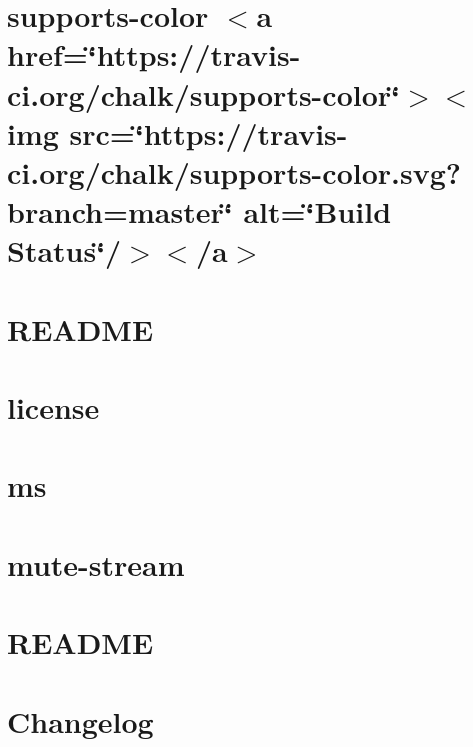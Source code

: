 \let\mypdfximage\pdfximage\def\pdfximage{\immediate\mypdfximage}\documentclass[twoside]{book}
\newcommand{\+}{\discretionary{\mbox{\scriptsize$\hookleftarrow$}}{}{}}
\begin{document}
\chapter{supports-\/color $<$a href=\char`\"{}https\+://travis-\/ci.\+org/chalk/supports-\/color\char`\"{}$>$$<$img src=\char`\"{}https\+://travis-\/ci.\+org/chalk/supports-\/color.\+svg?branch=master\char`\"{} alt=\char`\"{}\+Build Status\char`\"{}/$>$$<$/a$>$}
\label{md_heap-visualizer_node_modules_mocha_node_modules_supports-color_readme}

\chapter{R\+E\+A\+D\+ME}
\label{md_heap-visualizer_node_modules_mocha__r_e_a_d_m_e}

\chapter{license}
\label{md_heap-visualizer_node_modules_ms_license}

\chapter{ms}
\label{md_heap-visualizer_node_modules_ms_readme}

\chapter{mute-\/stream}
\label{md_heap-visualizer_node_modules_mute-stream__r_e_a_d_m_e}

\chapter{R\+E\+A\+D\+ME}
\label{md_heap-visualizer_node_modules_natural-compare__r_e_a_d_m_e}

\chapter{Changelog}
\label{md_heap-visualizer_node_modules_nice-try__c_h_a_n_g_e_l_o_g}

\end{document}
